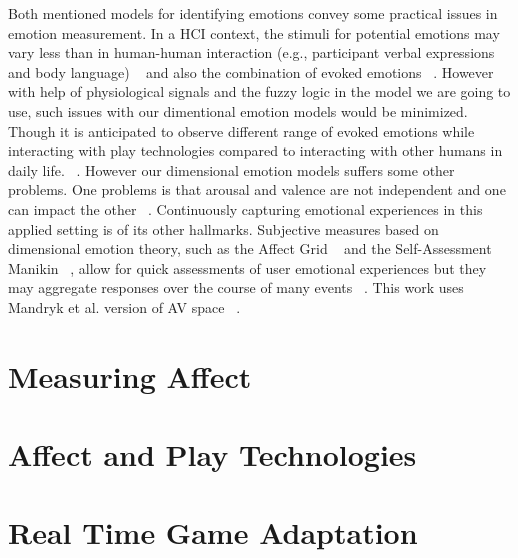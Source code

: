 Both mentioned models for identifying emotions convey some
practical issues in emotion measurement. In a HCI context, the 
stimuli for potential emotions may vary less than
in human-human interaction (e.g., participant verbal expressions and body language) 
~\cite{zhang2010service} and also the combination of
evoked emotions ~\cite{peter2006emotion}. However with help of physiological
signals and the fuzzy logic in the model we are going to
use, such issues with our dimentional emotion models would
be minimized. Though it is anticipated to observe different range 
of evoked emotions while interacting with play
technologies compared to interacting with other humans in
daily life. ~\cite{zhang2010service}. However our dimensional emotion models
suffers some other problems. One problems is that arousal
and valence are not independent and one can impact the
other ~\cite{mandryk2007fuzzy}. Continuously capturing emotional experiences
in this applied setting is of its other hallmarks. Subjective
measures based on dimensional emotion theory, such as the
Affect Grid ~\cite{russell1989affect} and the Self-Assessment 
Manikin ~\cite{bradley1994measuring}, allow
for quick assessments of user emotional experiences but they
may aggregate responses over the course of many events ~\cite{zhang2010service}.
This work uses Mandryk et al. version of AV space ~\cite{mandryk2007fuzzy}.


\section{Measuring Affect}


\section{Affect and Play Technologies}


\section{Real Time Game Adaptation}

